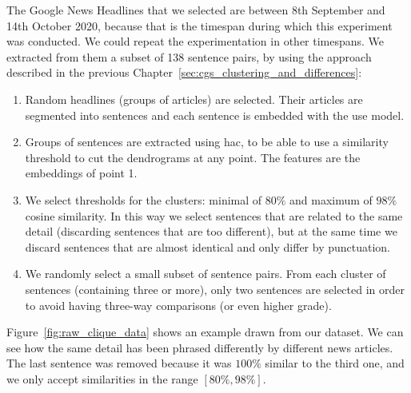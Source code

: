 The Google News Headlines that we selected are between 8th September and 14th October 2020,
because that is the timespan during which this experiment was conducted. We could repeat the experimentation in other timespans.
We extracted from them a subset of 138 sentence pairs, by using the approach described in the previous Chapter~\ref{sec:cgs_clustering_and_differences}:
\begin{enumerate}
    \item Random headlines (groups of articles) are selected. Their articles are segmented into sentences and each sentence is embedded with the \acrshort{use} model.
    \item Groups of sentences are extracted using \acrfull{hac}, to be able to use a similarity threshold to cut the dendrograms at any point. The features are the embeddings of point 1.
    \item We select thresholds for the clusters: minimal of $80\%$ and maximum of $98\%$ cosine similarity. In this way we select sentences that are related to the same detail (discarding sentences that are too different), but at the same time we discard sentences that are almost identical and only differ by punctuation.
    \item We randomly select a small subset of sentence pairs. From each cluster of sentences (containing three or more), only two sentences are selected in order to avoid having three-way comparisons (or even higher grade).
\end{enumerate}

Figure~\ref{fig:raw_clique_data} shows an example drawn from our dataset. We can see how the same detail has been phrased differently by different news articles.
The last sentence was removed because it was $100\%$ similar to the third one, and we only accept similarities in the range $[80\%,98\%]$.

